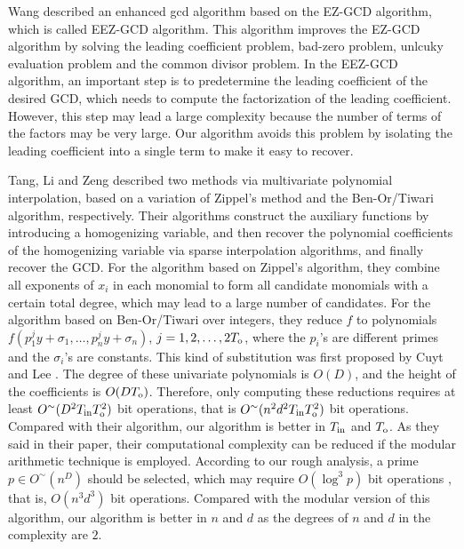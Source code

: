 \documentclass[final,20pt]{elsarticle}
\def\inp{{\rm{in}}}
\def\out{{\rm{o}}}
\begin{document}
Wang \cite{Wang80b} described an enhanced gcd algorithm based on the EZ-GCD algorithm, which is called EEZ-GCD algorithm. This algorithm improves the EZ-GCD algorithm by solving the leading coefficient problem, bad-zero problem, unlcuky evaluation problem and the common divisor problem. In the EEZ-GCD algorithm, an important step
is to predetermine the leading coefficient of the
desired GCD, which needs to compute the factorization of the leading coefficient. However, this step may lead a large complexity because the number of terms of the factors may be very large.
%
Our algorithm avoids this problem by isolating the leading coefficient into a single term to make it easy to recover.




Tang, Li and Zeng \cite{tang2018computing} described
two methods via multivariate polynomial interpolation, based on a variation of Zippel's
method and the Ben-Or/Tiwari algorithm, respectively.
%
Their algorithms construct the auxiliary functions by introducing a homogenizing variable, and then recover the polynomial coefficients
of the homogenizing variable via sparse interpolation algorithms, and finally recover the GCD.
%
For the algorithm based on Zippel's algorithm, they combine all exponents of $x_i$ in each monomial to form all candidate monomials with a certain total degree, which may lead to a large number of candidates.
%
For the algorithm based on Ben-Or/Tiwari over integers, they reduce $f$ to polynomials $f(p^j_1y+\sigma_1,\dots,p^j_ny+\sigma_n)$, $j=1,2,\dots,2T_{\out}$, where the $p_i$'s are different primes and the $\sigma_i$'s are constants. This kind of substitution was first proposed by  Cuyt and Lee \cite{cuyt2008new}.
%
The degree of these univariate polynomials is $O(D)$, and the height of the coefficients is $O(DT_{\out})$. Therefore, only computing these reductions requires at least  $O^\sim(D^2T_{\inp}T^2_{\out})$ bit operations, that is $O^\sim(n^2d^2T_{\inp}T^2_{\out})$ bit operations. Compared with their algorithm, our algorithm is better in $T_{\inp}$ and $T_{\out}$.
%
 As they said in their paper, their computational complexity can be reduced if the modular arithmetic technique is employed. According to our rough analysis, a prime $p\in O^\sim(n^D)$ should be selected, which may require $O(\log^3 p)$ bit operations \cite[The. 18.8]{GaGer13}, that is, $O(n^3d^3)$ bit operations. Compared with the modular version of this algorithm, our algorithm is better in $n$ and $d$ as the degrees of $n$ and $d$ in the complexity are $2$.
\end{document}
